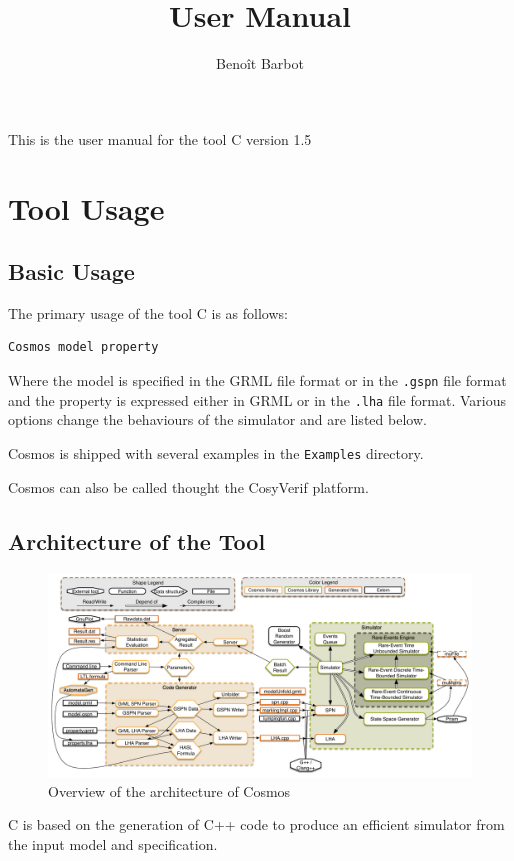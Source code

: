 \documentclass{article}
\title{\cosmos{} User Manual}
\author{Beno\^it Barbot}
\newcommand{\cosmos}{\mbox{\textup{C}\scalebox{0.75}{{\textsc{OSMOS}}}}}
\begin{document}
\maketitle


This is the user manual for the tool \cosmos{} version 1.5

\section{Tool Usage}

\subsection{Basic Usage}
The primary usage of the tool \cosmos{} is as follows:
\begin{verbatim}
Cosmos model property
\end{verbatim}
Where the model is specified in the GRML file format or in the
\verb|.gspn| file format and the property is expressed either in GRML
or in the \verb|.lha| file format. Various options change the behaviours 
of the simulator and are listed below.

Cosmos is shipped with several examples in the \verb|Examples| directory.

Cosmos can also be called thought the CosyVerif platform.




\subsection{Architecture of the Tool}
\begin{figure}[ht]
  \centering
  \includegraphics[width=\textwidth]{overviewcosmos}
  \caption{Overview of the architecture of Cosmos}
  \label{fig:overviewCosmos}
\end{figure}

\cosmos{} is based on the generation of C++ code to produce an efficient
simulator from the input model and specification. 
\end{document}
